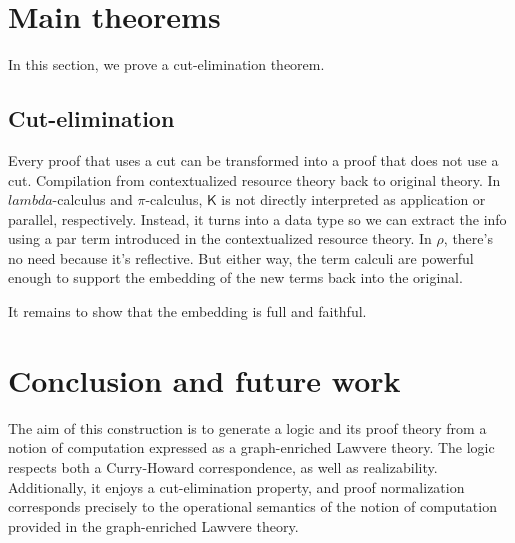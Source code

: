 \documentclass{llncs}
\renewcommand{\:}{\colon}
\newcommand{\pic}{$\pi$-calculus}
\begin{document}







\section{Main theorems}
In this section, we prove a cut-elimination theorem.
\subsection{Cut-elimination}
Every proof that uses a cut can be transformed into a proof that does
not use a cut.  Compilation from contextualized resource theory back
to original theory. In $lambda$-calculus and {\pic}, $\mathsf{K}$ is
not directly interpreted as application or parallel,
respectively. Instead, it turns into a data type so we can extract the
info using a par term introduced in the contextualized resource
theory.  In $\rho$, there's no need because it's reflective.  But either
way, the term calculi are powerful enough to support the embedding of
the new terms back into the original.

It remains to show that the embedding is full and faithful.
  

\section{Conclusion and future work}

The aim of this construction is to generate a logic and its proof
theory from a notion of computation expressed as a graph-enriched
Lawvere theory. The logic respects both a Curry-Howard correspondence,
as well as realizability. Additionally, it enjoys a cut-elimination
property, and proof normalization corresponds precisely to the
operational semantics of the notion of computation provided in the
graph-enriched Lawvere theory.
\end{document}

